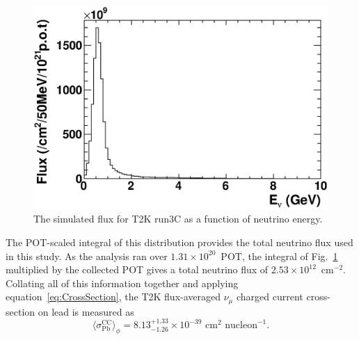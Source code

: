 \begin{figure}
  \centering
  \includegraphics[width=15cm]{images/measurement/xsec/run3c_flux.eps}
  \caption{The simulated flux for T2K run3C as a function of neutrino energy.}
  \label{fig:Run3CFlux}
\end{figure}
The POT-scaled integral of this distribution provides the total neutrino flux used in this study.  As the analysis ran over $1.31\times10^{20}$~POT, the integral of Fig.~\ref{fig:Run3CFlux} multiplied by the collected POT gives a total neutrino flux of $2.53\times10^{12}$~cm$^{-2}$.
\newline
\newline
Collating all of this information together and applying equation~\ref{eq:CrossSection}, the T2K flux-averaged $\nu_\mu$ charged current cross-section on lead is measured as 
\begin{equation}
\langle \sigma^{\textrm{CC}}_{\textrm{Pb}} \rangle_{\phi} = 8.13^{+1.33}_{-1.26} \times 10^{-39} \textrm{ cm}^2 \textrm{ nucleon}^{-1}.
\end{equation}





